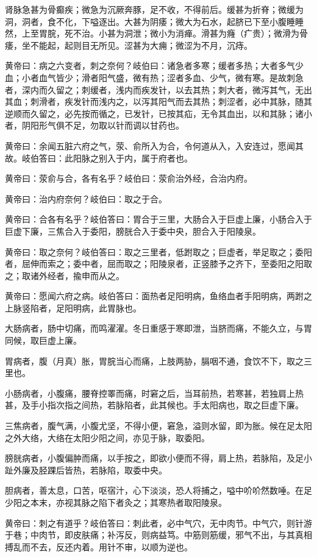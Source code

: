 \documentclass[a4paper,12pt,UTF8,twoside]{ctexbook}
\begin{document}
	肾脉急甚为骨癫疾；微急为沉厥奔豚，足不收，不得前后。缓甚为折脊；微缓为洞，洞者，食不化，下嗌逐出。大甚为阴痿；微大为石水，起脐已下至小腹睡睡然，上至胃脘，死不治。小甚为洞泄；微小为消瘅。滑甚为癃（疒贵）；微滑为骨痿，坐不能起，起则目无所见。涩甚为大痈；微涩为不月，沉痔。
	
	黄帝曰：病之六变者，刺之奈何？岐伯曰：诸急者多寒；缓者多热；大者多气少血；小者血气皆少；滑者阳气盛，微有热；涩者多血、少气，微有寒。是故刺急者，深内而久留之；刺缓者，浅内而疾发针，以去其热；刺大者，微泻其气，无出其血；刺滑者，疾发针而浅内之，以泻其阳气而去其热；刺涩者，必中其脉，随其逆顺而久留之，必先按而循之，已发针，已按其疝，无令其血出，以和其脉；诸小者，阴阳形气俱不足，勿取以针而调以甘药也。
	
	黄帝曰：余闻五脏六府之气，荥、俞所入为合，令何道从入，入安连过，愿闻其故。岐伯答曰：此阳脉之别入于内，属于府者也。
	
	黄帝曰：荥俞与合，各有名乎？岐伯曰：荥俞治外经，合治内府。
	
	黄帝曰：治内府奈何？岐伯曰：取之于合。
	
	黄帝曰：合各有名乎？岐伯答曰：胃合于三里，大肠合入于巨虚上廉，小肠合入于巨虚下廉，三焦合入于委阳，膀胱合入于委中央，胆合入于阳陵泉。
	
	黄帝曰：取之奈何？岐伯答曰：取之三里者，低跗取之；巨虚者，举足取之；委阳者，屈伸而索之；委中者，屈而取之；阳陵泉者，正竖膝予之齐下，至委阳之阳取之；取诸外经者，揄申而从之。
	
	黄帝曰：愿闻六府之病。岐伯答曰：面热者足阳明病，鱼络血者手阳明病，两跗之上脉竖陷者，足阳明病，此胃脉也。
	
	大肠病者，肠中切痛，而鸣濯濯。冬日重感于寒即泄，当脐而痛，不能久立，与胃同候，取巨虚上廉。
	
	胃病者，腹（月真）胀，胃脘当心而痛，上肢两胁，膈咽不通，食饮不下，取之三里也。
	
	小肠病者，小腹痛，腰脊控睪而痛，时窘之后，当耳前热，若寒甚，若独肩上热甚，及手小指次指之间热，若脉陷者，此其候也。手太阳病也，取之巨虚下廉。
	
	三焦病者，腹气满，小腹尤坚，不得小便，窘急，溢则水留，即为胀。候在足太阳之外大络，大络在太阳少阳之间，亦见于脉，取委阳。
	
	膀胱病者，小腹偏肿而痛，以手按之，即欲小便而不得，肩上热，若脉陷，及足小趾外廉及胫踝后皆热，若脉陷，取委中央。
	
	胆病者，善太息，口苦，呕宿汁，心下淡淡，恐人将捕之，嗌中吤吤然数唾。在足少阳之本末，亦视其脉之陷下者灸之；其寒热者取阳陵泉。
	
	黄帝曰：刺之有道乎？岐伯答曰：刺此者，必中气穴，无中肉节。中气穴，则针游于巷；中肉节，即皮肤痛；补泻反，则病益笃。中筋则筋缓，邪气不出，与其真相搏乱而不去，反还内着。用针不审，以顺为逆也。
	
\end{document}
